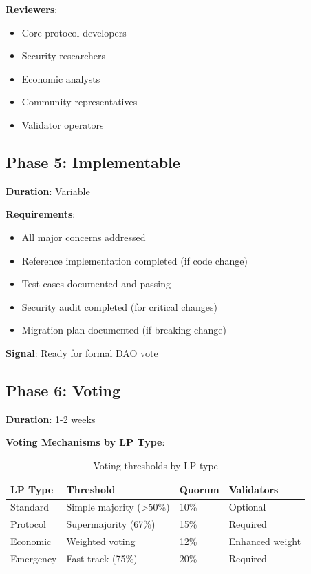 \documentclass[11pt,a4paper]{article}
\begin{document}
\textbf{Reviewers}:
\begin{itemize}
\item Core protocol developers
\item Security researchers
\item Economic analysts
\item Community representatives
\item Validator operators
\end{itemize}

\subsection{Phase 5: Implementable}

\textbf{Duration}: Variable

\textbf{Requirements}:
\begin{itemize}
\item All major concerns addressed
\item Reference implementation completed (if code change)
\item Test cases documented and passing
\item Security audit completed (for critical changes)
\item Migration plan documented (if breaking change)
\end{itemize}

\textbf{Signal}: Ready for formal DAO vote

\subsection{Phase 6: Voting}

\textbf{Duration}: 1-2 weeks

\textbf{Voting Mechanisms by LP Type}:

\begin{table}[h]
\centering
\begin{tabular}{@{}llll@{}}
\toprule
\textbf{LP Type} & \textbf{Threshold} & \textbf{Quorum} & \textbf{Validators} \\ \midrule
Standard & Simple majority (>50\%) & 10\% & Optional \\
Protocol & Supermajority (67\%) & 15\% & Required \\
Economic & Weighted voting & 12\% & Enhanced weight \\
Emergency & Fast-track (75\%) & 20\% & Required \\ \bottomrule
\end{tabular}
\caption{Voting thresholds by LP type}
\end{table}
\end{document}

